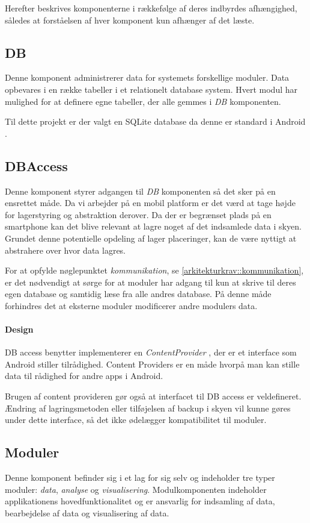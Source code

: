 Herefter beskrives komponenterne i rækkefølge af deres indbyrdes afhængighed, således at forståelsen af hver komponent kun afhænger af det læste.

\subsection{DB}
Denne komponent administrerer data for systemets forskellige moduler.
Data opbevares i en række tabeller i et relationelt database system.
Hvert modul har mulighed for at definere egne tabeller, der alle gemmes i \textit{DB} komponenten.

Til dette projekt er der valgt en SQLite database da denne er standard i Android \citep{android_database}.


\subsection{DBAccess}\label{subsec:DBACCESS}
Denne komponent styrer adgangen til \textit{DB} komponenten så det sker på en ensrettet måde.
Da vi arbejder på en mobil platform er det værd at tage højde for lagerstyring og abstraktion derover.
Da der er begrænset plads på en smartphone kan det blive relevant at lagre noget af det indsamlede data i skyen.
Grundet denne potentielle opdeling af lager placeringer, kan de være nyttigt at abstrahere over hvor data lagres.

For at opfylde nøglepunktet \textit{kommunikation}, se \cref{arkitekturkrav::kommunikation}, er det nødvendigt at sørge for at moduler har adgang til kun at skrive til deres egen database og samtidig læse fra alle andres database.
På denne måde forhindres det at eksterne moduler modificerer andre modulers data.

\paragraph{Design} 
DB access benytter implementerer en \textit{ContentProvider} \citep{contentprovider}, der er et interface som Android stiller tilrådighed.
Content Providers er en måde hvorpå man kan stille data til rådighed for andre apps i Android.

Brugen af content provideren gør også at interfacet til DB access er veldefineret.
Ændring af lagringsmetoden eller tilføjelsen af backup i skyen vil kunne gøres under dette interface, så det ikke ødelægger kompatibilitet til moduler.

\subsection{Moduler}
Denne komponent befinder sig i et lag for sig selv og indeholder tre typer moduler: \textit{data}, \textit{analyse} og \textit{visualisering}.
Modulkomponenten indeholder applikationens hovedfunktionalitet og er ansvarlig for indsamling af data, bearbejdelse af data og visualisering af data.

